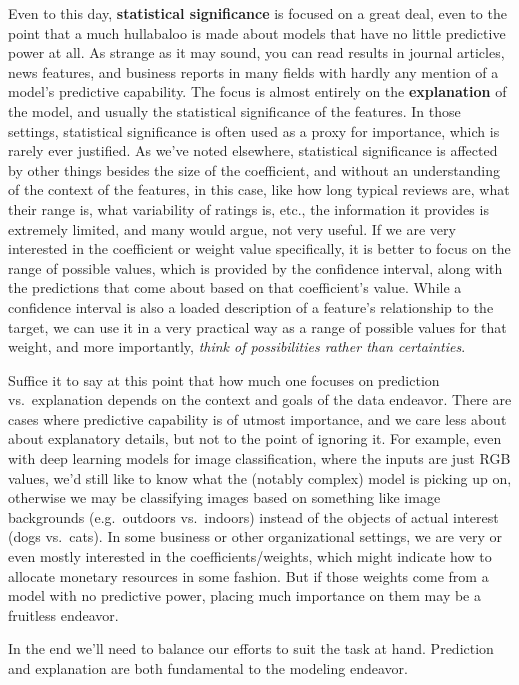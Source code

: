 \documentclass[
  letterpaper,
]{krantz}
\begin{document}
Even to this day, \textbf{statistical significance} is focused on a
great deal, even to the point that a much hullabaloo is made about
models that have no little predictive power at all. As strange as it may
sound, you can read results in journal articles, news features, and
business reports in many fields with hardly any mention of a model's
predictive capability. The focus is almost entirely on the
\textbf{explanation} of the model, and usually the statistical
significance of the features. In those settings, statistical
significance is often used as a proxy for importance, which is rarely
ever justified. As we've noted elsewhere, statistical significance is
affected by other things besides the size of the coefficient, and
without an understanding of the context of the features, in this case,
like how long typical reviews are, what their range is, what variability
of ratings is, etc., the information it provides is extremely limited,
and many would argue, not very useful. If we are very interested in the
coefficient or weight value specifically, it is better to focus on the
range of possible values, which is provided by the confidence interval,
along with the predictions that come about based on that coefficient's
value. While a confidence interval is also a loaded description of a
feature's relationship to the target, we can use it in a very practical
way as a range of possible values for that weight, and more importantly,
\emph{think of possibilities rather than certainties}.

Suffice it to say at this point that how much one focuses on prediction
vs.~explanation depends on the context and goals of the data endeavor.
There are cases where predictive capability is of utmost importance, and
we care less about about explanatory details, but not to the point of
ignoring it. For example, even with deep learning models for image
classification, where the inputs are just RGB values, we'd still like to
know what the (notably complex) model is picking up on, otherwise we may
be classifying images based on something like image backgrounds
(e.g.~outdoors vs.~indoors) instead of the objects of actual interest
(dogs vs.~cats). In some business or other organizational settings, we
are very or even mostly interested in the coefficients/weights, which
might indicate how to allocate monetary resources in some fashion. But
if those weights come from a model with no predictive power, placing
much importance on them may be a fruitless endeavor.

In the end we'll need to balance our efforts to suit the task at hand.
Prediction and explanation are both fundamental to the modeling
endeavor.
\end{document}
